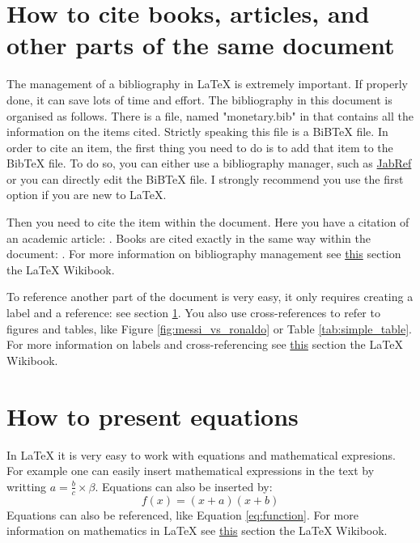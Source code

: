 \documentclass[11pt,a4paper,oneside]{book}
\newcommand{\latex}{\LaTeX\xspace} %
\begin{document}
\section{How to cite books, articles, and other parts of the same document}
\label{sec:citations}
The management of a bibliography in \latex is extremely important. If properly done, it can save lots of time and effort. The bibliography in this document is organised as follows. There is a file, named "monetary.bib" in that contains all the information on the items cited. Strictly speaking this file is a BiBTeX file. In order to cite an item, the first thing you need to do is to add that item to the BibTeX file. To do so, you can either use a bibliography manager, such as \href{http://www.jabref.org/}{JabRef} or you can directly edit the BiBTeX file. I strongly recommend you use the first option if you are new to \latex.

Then you need to cite the item within the document. Here you have a citation of an academic article: \citet*{Cooley_Hansen_1989}. Books are cited exactly in the same way within the document: \citet*{Blanchard_2017}. For more information on bibliography management see \href{https://en.wikibooks.org/wiki/LaTeX/Bibliography_Management}{this} section the \latex Wikibook.

To reference another part of the document is very easy, it only requires creating a label and a reference: see section \ref{sec:citations}. You also use cross-references to refer to figures and tables, like Figure \ref{fig:messi_vs_ronaldo} or Table \ref{tab:simple_table}. For more information on labels and cross-referencing see \href{https://en.wikibooks.org/wiki/LaTeX/Labels_and_Cross-referencing}{this} section the \latex Wikibook.

\section{How to present equations}
\label{sec:math}
In \latex it is very easy to work with equations and mathematical expresions. For example one can easily insert mathematical expressions in the text by writting $ a = \frac{b}{c} \times \beta $. Equations can also be inserted by:
\begin{equation}
  f(x)=(x+a)(x+b)
  \label{eq:function}
\end{equation}
Equations can also be referenced, like Equation \ref{eq:function}. For more information on mathematics in \latex see \href{https://en.wikibooks.org/wiki/LaTeX/Mathematics}{this} section the \latex Wikibook.
\end{document}
